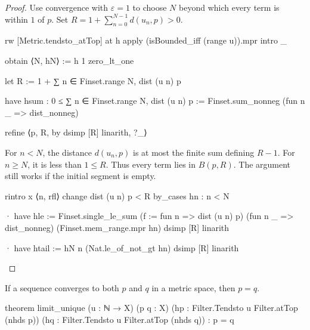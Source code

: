 \begin{proof}
  Use convergence with $\varepsilon=1$ to choose $N$ beyond which every term is within $1$ of $p$.
  Set $R=1+\sum_{n=0}^{N-1}d(u_n,p)>0$.

  \begin{lean}
    rw [Metric.tendsto_atTop] at h
    apply (isBounded_iff (range u)).mpr
    intro _

    obtain ⟨N, hN⟩ := h 1 zero_lt_one

    let R := 1 + ∑ n ∈ Finset.range N, dist (u n) p

    have hsum : 0 ≤ ∑ n ∈ Finset.range N, dist (u n) p :=
      Finset.sum_nonneg (fun n _ => dist_nonneg)

    refine ⟨p, R, by
      dsimp [R]
      linarith, ?_⟩
  \end{lean}

  For $n<N$, the distance $d(u_n,p)$ is at most the finite sum defining $R-1$.
  For $n\geq N$, it is less than $1\leq R$.
  Thus every term lies in $B(p,R)$.
  The argument still works if the initial segment is empty.

  \begin{lean}
    rintro x ⟨n, rfl⟩
    change dist (u n) p < R
    by_cases hn : n < N

    · have hle := Finset.single_le_sum (f := fun n => dist (u n) p)
        (fun n _ => dist_nonneg) (Finset.mem_range.mpr hn)
      dsimp [R]
      linarith

    · have htail := hN n (Nat.le_of_not_gt hn)
      dsimp [R]
      linarith
  \end{lean}

\end{proof}

\begin{lemma}
  \label{ma:lem:limit-unique}
  If a sequence converges to both $p$ and $q$ in a metric space, then $p=q$.

  \begin{lean}
    theorem limit_unique (u : ℕ → X) (p q : X)
        (hp : Filter.Tendsto u Filter.atTop (nhds p))
        (hq : Filter.Tendsto u Filter.atTop (nhds q)) : p = q
  \end{lean}
\end{lemma}

